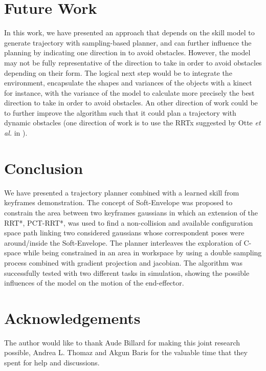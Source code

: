 \documentclass[letterpaper, 10 pt, conference]{ieeeconf}  %
\begin{document}
\section{Future Work}
In this work, we have presented an approach that depends on the skill model to generate trajectory with sampling-based planner, and can further influence the planning by indicating one direction in to avoid obstacles. However, the model may not be fully representative of the direction to take in order to avoid obstacles depending on their form. The logical next step would be to integrate the environment, encapsulate the shapes and variances of the objects with a kinect for instance, with the variance of the model to calculate more precisely the best direction to take in order to avoid obstacles.
An other direction of work could be to further improve the algorithm such that it could plan a trajectory with dynamic obstacles (one direction of work is to use the RRTx suggested by Otte \textit{et al.} in \cite{RRTx}). 

\section{Conclusion}
We have presented a trajectory planner combined with a learned skill from keyframes demonstration. The concept of Soft-Envelope was proposed to constrain the area between two keyframes gaussians in which an extension of the RRT*, PCT-RRT*, was used to find a non-collision and available configuration space path linking two considered gaussians whose correspondent poses were around/inside the Soft-Envelope. The planner interleaves the exploration of C-space while being constrained in an area in workspace by using a double sampling process combined with gradient projection and jacobian.
The algorithm was successfully tested with two different tasks in simulation, showing the possible influences of the model on the motion of the end-effector.

\section{Acknowledgements}
The author would like to thank Aude Billard for making this joint research possible, Andrea L. Thomaz and Akgun Baris for the valuable time that they spent for help and discussions.


\end{document}
